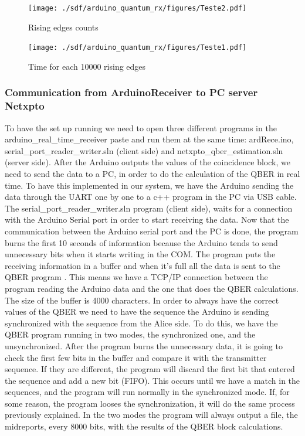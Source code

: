 \begin{refsection}
\begin{figure}[H]
	\centering
	\texttt{[image: ./sdf/arduino\_quantum\_rx/figures/Teste2.pdf]}
	\caption{Rising edges counts}
	\label{montage}
\end{figure}

\begin{figure}[H]
	\centering
	\texttt{[image: ./sdf/arduino\_quantum\_rx/figures/Teste1.pdf]}
	\caption{Time for each 10000 rising edges}
	\label{montage}
\end{figure}
	
	
	\subsubsection{Communication from ArduinoReceiver to PC server Netxpto}
	
	To have the set up running we need to open three different programs in the arduino\_real\_time\_receiver paste and run them at the same time: ardRece.ino, serial\_port\_reader\_writer.sln (client side) and netxpto\_qber\_estimation.sln (server side). After the Arduino outputs the values of the coincidence block, we need to send the data to a PC, in order to do the calculation of the QBER in real time. To have this implemented in our system, we have the Arduino sending the data through the UART one by one to a c++ program in the PC via USB cable. The serial\_port\_reader\_writer.sln program (client side), waits for a connection with the Arduino Serial port in order to start receiving the data. Now that the communication between the Arduino serial port and the PC is done, the program burns the first 10 seconds of information because the Arduino tends to send unnecessary bits when it starts writing in the COM. The program puts the receiving information in a buffer and when it's full all the data is sent to the QBER program . This means we have a TCP/IP connection between the program reading the Arduino data and the one that does the QBER calculations. The size of the buffer is 4000 characters. In order to always have the correct values of the QBER we need to have the sequence the Arduino is sending synchronized with the sequence from the Alice side. To do this, we have the QBER program running in two modes, the synchronized one, and the unsynchronized. After the program burns the unnecessary data, it is going to check the first few bits in the buffer and compare it with the transmitter sequence. If they are different, the program will discard the first bit that entered the sequence and add a new bit (FIFO). This occurs until we have a match in the sequences, and the program will run normally in the synchronized mode. If, for some reason, the program looses the synchronization, it will do the same process previously explained. In the two modes the program will always  output a file, the midreports, every 8000 bits, with the results of the QBER block calculations. 
	

\end{refsection}
